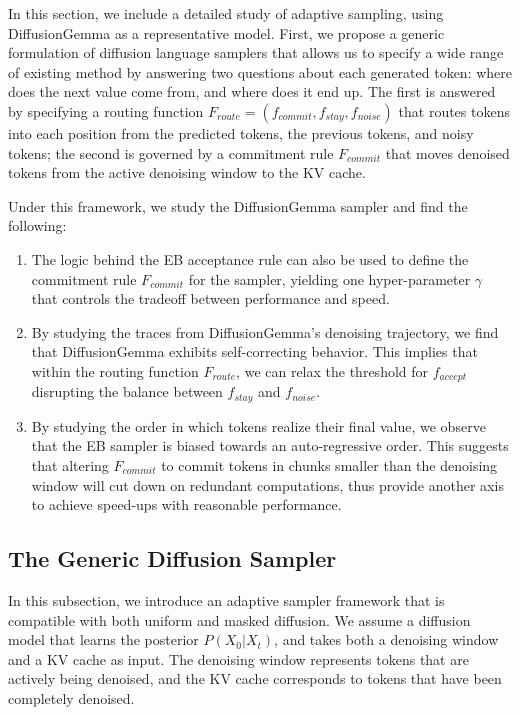 In this section, we include a detailed study of adaptive sampling, using DiffusionGemma as a representative model.
First, we propose a generic formulation of diffusion language samplers that allows us to specify a wide range of existing method by answering two questions about each generated token: where does the next value come from, and where does it end up.
The first is answered by specifying a routing function $F_{route} = (f_{commit}, f_{stay}, f_{noise})$ that routes tokens into each position from the predicted tokens, the previous tokens, and noisy tokens; the second is governed by a commitment rule $F_{commit}$ that moves denoised tokens from the active denoising window to the KV cache.

Under this framework, we study the DiffusionGemma sampler and find the following: 
\begin{enumerate}
    \item The logic behind the EB acceptance rule can also be used to define the commitment rule $F_{commit}$ for the sampler, yielding one hyper-parameter $\gamma$ that controls the tradeoff between performance and speed.
    \item By studying the traces from DiffusionGemma's denoising trajectory, we find that DiffusionGemma exhibits self-correcting behavior. This implies that within the routing function $F_{route}$, we can relax the threshold for $f_{accept}$ disrupting the balance between $f_{stay}$ and $f_{noise}$.
    \item By studying the order in which tokens realize their final value, we observe that the EB sampler is biased towards an auto-regressive order. This suggests that altering $F_{commit}$ to commit tokens in chunks smaller than the denoising window will cut down on redundant computations, thus provide another axis to achieve speed-ups with reasonable performance.
\end{enumerate}

\subsection{The Generic Diffusion Sampler}
In this subsection, we introduce an adaptive sampler framework that is compatible with both uniform and masked diffusion.
We assume a diffusion model that learns the posterior $P(X_0 | X_t)$, and takes both a denoising window and a KV cache as input.
The denoising window represents tokens that are actively being denoised, and the KV cache corresponds to tokens that have been completely denoised.


